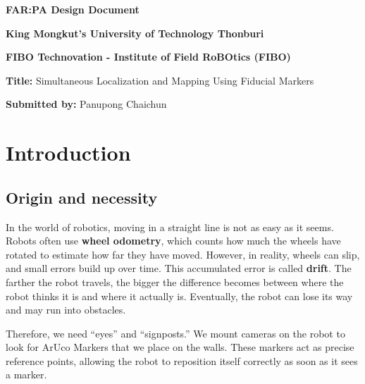 \documentclass[10pt]{article}
\begin{document}
\begin{raggedright}
\textbf{FAR:PA Design Document}\par
\textbf{King Mongkut's University of Technology Thonburi}\par
\textbf{FIBO Technovation - Institute of Field RoBOtics (FIBO)}\par
\textbf{Title: } Simultaneous Localization and Mapping Using Fiducial Markers\par
\textbf{Submitted by: } Panupong Chaichun\par
\end{raggedright}

\section{Introduction}

\subsection{Origin and necessity}

\begin{figure}[h]
\centering
\end{figure}

In the world of robotics, moving in a straight line is not as easy as it seems. Robots often use \textbf{wheel odometry}, which counts how much the wheels have rotated to estimate how far they have moved. However, in reality, wheels can slip, and small errors build up over time. This accumulated error is called \textbf{drift}. The farther the robot travels, the bigger the difference becomes between where the robot thinks it is and where it actually is. Eventually, the robot can lose its way and may run into obstacles.

Therefore, we need ``eyes'' and ``signposts.'' We mount cameras on the robot to look for ArUco Markers that we place on the walls. These markers act as precise reference points, allowing the robot to reposition itself correctly as soon as it sees a marker.
\end{document}
